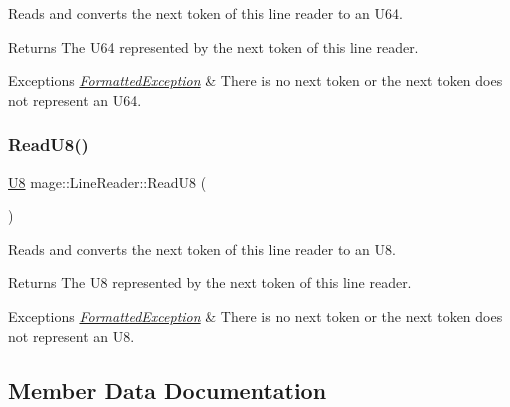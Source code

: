 Reads and converts the next token of this line reader to an {\ttfamily U64}.

\begin{DoxyReturn}{Returns}
The {\ttfamily U64} represented by the next token of this line reader. 
\end{DoxyReturn}

\begin{DoxyExceptions}{Exceptions}
{\em \hyperlink{classmage_1_1_formatted_exception}{Formatted\+Exception}} & There is no next token or the next token does not represent an {\ttfamily U64}. \\
\hline
\end{DoxyExceptions}
\hypertarget{classmage_1_1_line_reader_a5fcc116b81d0357acdb9641e8f293e31}{}\label{classmage_1_1_line_reader_a5fcc116b81d0357acdb9641e8f293e31} 
\subsubsection{\texorpdfstring{Read\+U8()}{ReadU8()}}
{\footnotesize\ttfamily \hyperlink{namespacemage_afc638980bc6154f15af5e2d93a0e0ea9}{U8} mage\+::\+Line\+Reader\+::\+Read\+U8 (\begin{DoxyParamCaption}{ }\end{DoxyParamCaption})\hspace{0.3cm}{\ttfamily [protected]}}

Reads and converts the next token of this line reader to an {\ttfamily U8}.

\begin{DoxyReturn}{Returns}
The {\ttfamily U8} represented by the next token of this line reader. 
\end{DoxyReturn}

\begin{DoxyExceptions}{Exceptions}
{\em \hyperlink{classmage_1_1_formatted_exception}{Formatted\+Exception}} & There is no next token or the next token does not represent an {\ttfamily U8}. \\
\hline
\end{DoxyExceptions}


\subsection{Member Data Documentation}
\hypertarget{classmage_1_1_line_reader_a2f1cfe313dc89741386178e63a6b8b0c}{}\label{classmage_1_1_line_reader_a2f1cfe313dc89741386178e63a6b8b0c} 

